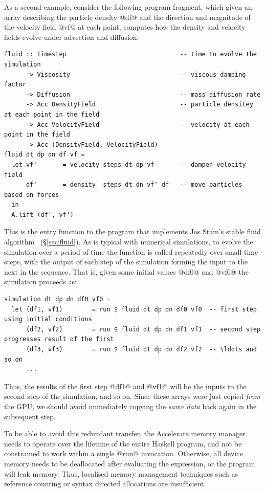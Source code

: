 As a second example, consider the following program fragment, which given an
array describing the particle density @df@ and the direction and magnitude
of the velocity field @vf@ at each point, computes how the density and
velocity fields evolve under advection and diffusion:
%
\begin{lstlisting}[style=haskell]
fluid :: Timestep                               -- time to evolve the simulation
      -> Viscosity                              -- viscous damping factor
      -> Diffusion                              -- mass diffusion rate
      -> Acc DensityField                       -- particle densitey at each point in the field
      -> Acc VelocityField                      -- velocity at each point in the field
      -> Acc (DensityField, VelocityField)
fluid dt dp dn df vf =
  let vf'       = velocity steps dt dp vf       -- dampen velocity field
      df'       = density  steps dt dn vf' df   -- move particles based on forces
  in
  A.lift (df', vf')
\end{lstlisting}
%
This is the entry function to the program that implements Jos Stam's stable
fluid algorithm~\cite{Stam:1999ey} (\S\ref{sec:fluid}). As is typical with
numerical simulations, to evolve the simulation over a period of time the
function is called repeatedly over small time steps, with the output of each
step of the simulation forming the input to the next in the sequence. That is,
given some initial values @df0@ and @vf0@ the simulation proceeds as:
%
\begin{lstlisting}[style=haskell]
simulation dt dp dn df0 vf0 =
  let (df1, vf1)        = run $ fluid dt dp dn df0 vf0  -- first step using initial conditions
      (df2, vf2)        = run $ fluid dt dp dn df1 vf1  -- second step progresses result of the first
      (df3, vf3)        = run $ fluid dt dp dn df2 vf2  -- \ldots and so on
      ...
\end{lstlisting}
%
Thus, the results of the first step @df1@ and @vf1@ will be the inputs
to the second step of the simulation, and so on. Since these arrays were just
copied \emph{from} the GPU, we should avoid immediately copying the \emph{same
data} back again in the subsequent step.

To be able to avoid this redundant transfer, the Accelerate memory manager needs
to operate over the lifetime of the entire Haskell program, and not be
constrained to work within a single @run@ invocation. Otherwise, all device
memory needs to be deallocated after evaluating the expression, or the program
will leak memory. Thus, localised memory management techniques such as reference
counting or syntax directed allocations are insufficient.

